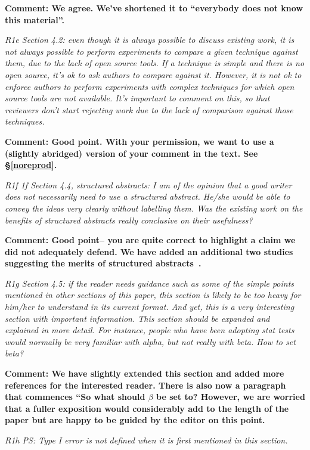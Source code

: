 {\bf Comment: We agree. We've shortened it to ``everybody does not know  this material''.
}

{\em R1e Section 4.2: even though it is always possible to discuss existing work, it is not always possible to perform experiments to compare a given technique against them, due to the lack of open source tools. If a technique is simple and there is no open source, it's ok to ask authors to compare against it. However, it is not ok to enforce authors to perform experiments with complex techniques for which open source tools are not available. It's important to comment on this, so that reviewers don't start rejecting work due to the lack of comparison against those techniques. }

{\bf Comment: Good point.  With your permission, we want to use a (slightly abridged) version of your comment in the text.
See \S\vref{noreprod}.
}

{\em R1f  1f Section 4.4, structured abstracts: I am of the opinion that a good writer does not necessarily need to use a structured abstract. He/she would be able to convey the ideas very clearly without labelling them. Was the existing work on the benefits of structured abstracts really conclusive on their usefulness?}

{\bf Comment: Good point-- you are quite correct to highlight a claim we did not adequately defend.  We have added an additional two studies suggesting the merits of structured abstracts~\cite{4460893,booth1997value}.}

{\em R1g Section 4.5: if the reader needs guidance such as some of the simple points mentioned in other sections of this paper, this section is likely to be too heavy for him/her to understand in its current format. And yet, this is a very interesting section with important information. This section should be expanded and explained in more detail. For instance, people who have been adopting stat tests would normally be very familiar with alpha, but not really with beta. How to set beta?}

{\bf Comment: We have slightly extended this section and added more references for the interested reader.  There is also now a paragraph that commences ``So what should $\beta$ be set to? However, we are worried that a fuller exposition would considerably add to the length of the paper but are happy to be guided by the editor on this point.
}

{\em R1h PS: Type I error is not defined when it is first mentioned in this section. }

